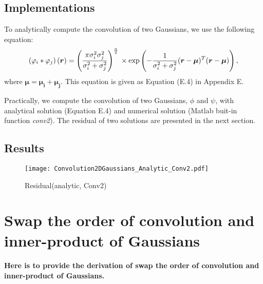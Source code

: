 \documentclass[a4paper, 12pt, english]{article}
\begin{document}
\subsection{Implementations}
To analytically compute the convolution of two Gaussians, we use the following
equation:
$$\left(\varphi_i\ast\varphi_j\right)(\boldsymbol{r}) = \left(\frac{\pi\sigma^2_i\sigma^2_j}{\sigma^2_i + \sigma^2_j}\right)^{\frac{n}{2}}\\
\times\exp\left(-\frac{1}{\sigma^2_i + \sigma^2_j}(\boldsymbol{r}-\boldsymbol{\mu})^T(\boldsymbol{r}-\boldsymbol{\mu})\right), $$
where $\boldsymbol{\mu} = \boldsymbol{\mu_i} + \boldsymbol{\mu_j} $.
This equation is given as Equation (E.4) in Appendix E.\par

Practically, we compute the convolution of two Gaussians, $\phi$ and $\psi $,
with analytical solution (Equation E.4) and numerical solution (Matlab
buit-in function \textit{conv2}).
The residual of two solutions are presented in the next section.


\subsection{Results}
\begin{figure}[H]
\centering
\texttt{[image: Convolution2DGaussians\_Analytic\_Conv2.pdf]}
\caption{Residual(analytic, Conv2)}\label{Convolution2DGaussians_Analytic_Conv2.pdf}
\end{figure}



\newpage

\section{Swap the order of convolution and inner-product of Gaussians}
\paragraph{Here is to provide the derivation of swap the order of convolution and inner-product of Gaussians.}
\end{document}
